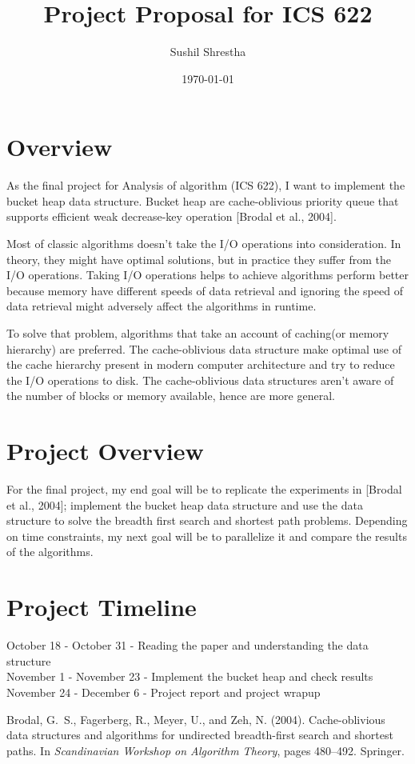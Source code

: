\documentclass[11pt]{article}
\title{Project Proposal for ICS 622}
\author{Sushil Shrestha}
\date{\today}
\begin{document}
    \maketitle
    \section{Overview}
    As the final project for Analysis of algorithm (ICS 622), I want to implement the bucket heap data structure. Bucket heap are cache-oblivious priority queue that supports efficient weak decrease-key operation [Brodal et al., 2004].

    Most of classic algorithms doesn’t take the I/O operations into consideration. In theory, they might have optimal solutions, but in practice they suffer from the I/O operations. Taking I/O operations helps to achieve algorithms perform better because memory have different speeds of data retrieval and ignoring the speed of data retrieval might adversely affect the algorithms in runtime.

    To solve that problem, algorithms that take an account of caching(or memory hierarchy) are preferred. The cache-oblivious data structure make optimal use of the cache hierarchy present in modern computer architecture and try to reduce the I/O operations to disk.  The cache-oblivious data structures aren’t aware of the number of blocks or memory available, hence are more general.

    \section{Project Overview}
    For the final project, my end goal will be to replicate the experiments in [Brodal et al., 2004];  implement the bucket heap data structure and use the data structure to solve the breadth first search and shortest path problems. Depending on time constraints, my next goal will be to parallelize it and compare the results of the algorithms.

    \section{Project Timeline}
    October 18 - October 31 - Reading the paper and understanding the data structure\\
    November 1 - November 23 - Implement the bucket heap and check results\\
    November 24 - December 6 - Project report and project wrapup\\



\begin{thebibliography}{9}
    Brodal, G.~S., Fagerberg, R., Meyer, U., and Zeh, N. (2004).
    \newblock Cache-oblivious data structures and algorithms for undirected
    breadth-first search and shortest paths.
    \newblock In {\em Scandinavian Workshop on Algorithm Theory}, pages 480--492.
    Springer.
\end{thebibliography}
\end{document}
